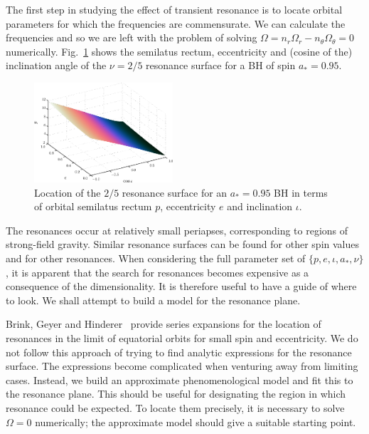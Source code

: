 \documentclass[aps,prd,amsfonts,amssymb,amsmath,nofootinbib,reprint,showpacs,superscriptaddress,twocolumn]{revtex4}
\newcommand{\Figref}[1]{Fig.\ \ref{fig:#1}}
\begin{document}
The first step in studying the effect of transient resonance is to locate orbital parameters for which the frequencies are commensurate. We can calculate the frequencies and so we are left with the problem of solving $\Omega = n_r \Omega_r - n_\theta \Omega_\theta = 0$ numerically. \Figref{res-plane-2-5-95} shows the semilatus rectum, eccentricity and (cosine of the) inclination angle of the $\nu = 2/5$ resonance surface for a BH of spin $a_\ast = 0.95$. 
\begin{figure}[htbp]
\centering
\includegraphics[width=0.46\textwidth]{Fig_res-2-5-95-plane}
\caption{\label{fig:res-plane-2-5-95}Location of the $2/5$ resonance surface for an $a_\ast = 0.95$ BH in terms of orbital semilatus rectum $p$, eccentricity $e$ and inclination $\iota$.}
\end{figure}
The resonances occur at relatively small periapses, corresponding to regions of strong-field gravity.
Similar resonance surfaces can be found for other spin values and for other resonances. When considering the full parameter set of $\{p,e,\iota,a_\ast,\nu\}$, it is apparent that the search for resonances becomes expensive as a consequence of the dimensionality. It is therefore useful to have a guide of where to look. We shall attempt to build a model for the resonance plane.

Brink, Geyer and Hinderer~\cite{Brink2013} provide series expansions for the location of resonances in the limit of equatorial orbits for small spin and eccentricity. We do not follow this approach of trying to find analytic expressions for the resonance surface. The expressions become complicated when venturing away from limiting cases. Instead, we build an approximate phenomenological model and fit this to the resonance plane. %
This should be useful for designating the region in which resonance could be expected. To locate them precisely, it is necessary to solve $\Omega = 0$ numerically; the approximate model should give a suitable starting point.
\end{document}
